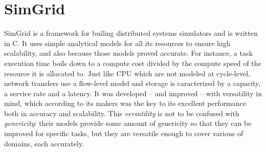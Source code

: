 %
%
%
%
%
%
%
\section{SimGrid}

SimGrid \cite{casanova:hal-01017319} is a framework for builing distributed
systems simulators and is written in C. It uses simple analytical models for
all its resources to ensure high scalability, and also because those models
proved accurate. For instance, a task execution time boils down to a compute
cost divided by the compute speed of the resource it is allocated to. Just like
CPU which are not modeled at cycle-level, network transfers use a flow-level
model and storage is caracterized by a capacity, a service rate and a latency.
It was developed -- and improved -- with versatility in mind, which according
to its makers was the key to its excellent performance both in accuracy and
scalability. This \textit{versatility} is not to be confused with
\textit{genericity}: their models provide some amount of genericity so that
they can be improved for specific tasks, but they are versatile enough to cover
various of domains, each accurately. 

